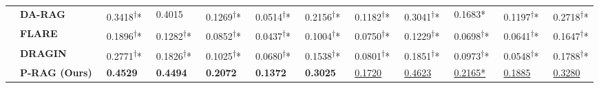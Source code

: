 \documentclass[sigconf,natbib=true,anonymous=false]{acmart}
\begin{document}
\begin{table}[t]
\begin{tabular}{|cl|c|c|c|c|c|c|c|c|c|c|}
& \textbf{DA-RAG} 
& \multicolumn{1}{l|}{~0.3418\textsuperscript{\tiny $\dagger$}*}& \multicolumn{1}{l|}{~0.4015}& \multicolumn{1}{l|}{~0.1269\textsuperscript{\tiny $\dagger$}*}& \multicolumn{1}{l|}{~0.0514\textsuperscript{\tiny $\dagger$}*}& \multicolumn{1}{l|}{~0.2156\textsuperscript{\tiny $\dagger$}*}& \multicolumn{1}{l|}{~0.1182\textsuperscript{\tiny $\dagger$}*}& \multicolumn{1}{l|}{~0.3041\textsuperscript{\tiny $\dagger$}*}& \multicolumn{1}{l|}{~0.1683*}& \multicolumn{1}{l|}{~0.1197\textsuperscript{\tiny $\dagger$}*}& \multicolumn{1}{l|}{~0.2718\textsuperscript{\tiny $\dagger$}*}\\


& \textbf{FLARE} 
& \multicolumn{1}{l|}{~0.1896\textsuperscript{\tiny $\dagger$}*}& \multicolumn{1}{l|}{~0.1282\textsuperscript{\tiny $\dagger$}*}& \multicolumn{1}{l|}{~0.0852\textsuperscript{\tiny $\dagger$}*}& \multicolumn{1}{l|}{~0.0437\textsuperscript{\tiny $\dagger$}*}& \multicolumn{1}{l|}{~0.1004\textsuperscript{\tiny $\dagger$}*}& \multicolumn{1}{l|}{~0.0750\textsuperscript{\tiny $\dagger$}*}& \multicolumn{1}{l|}{~0.1229\textsuperscript{\tiny $\dagger$}*}& \multicolumn{1}{l|}{~0.0698\textsuperscript{\tiny $\dagger$}*}& \multicolumn{1}{l|}{~0.0641\textsuperscript{\tiny $\dagger$}*}& \multicolumn{1}{l|}{~0.1647\textsuperscript{\tiny $\dagger$}*}\\

& \textbf{DRAGIN}
& \multicolumn{1}{l|}{~0.2771\textsuperscript{\tiny $\dagger$}*}& \multicolumn{1}{l|}{~0.1826\textsuperscript{\tiny $\dagger$}*}& \multicolumn{1}{l|}{~0.1025\textsuperscript{\tiny $\dagger$}*}& \multicolumn{1}{l|}{~0.0680\textsuperscript{\tiny $\dagger$}*}& \multicolumn{1}{l|}{~0.1538\textsuperscript{\tiny $\dagger$}*}& \multicolumn{1}{l|}{~0.0801\textsuperscript{\tiny $\dagger$}*}& \multicolumn{1}{l|}{~0.1851\textsuperscript{\tiny $\dagger$}*}& \multicolumn{1}{l|}{~0.0973\textsuperscript{\tiny $\dagger$}*}& \multicolumn{1}{l|}{~0.0548\textsuperscript{\tiny $\dagger$}*}& \multicolumn{1}{l|}{~0.1788\textsuperscript{\tiny $\dagger$}*}\\

& \textbf{P-RAG (Ours)}
& \multicolumn{1}{l|}{~\textbf{0.4529}}& \multicolumn{1}{l|}{~\textbf{0.4494}}& \multicolumn{1}{l|}{~\textbf{0.2072}}& \multicolumn{1}{l|}{~\textbf{0.1372}}& \multicolumn{1}{l|}{~\textbf{0.3025}}& \multicolumn{1}{l|}{~\underline{0.1720}}& \multicolumn{1}{l|}{~\underline{0.4623}}& \multicolumn{1}{l|}{~\underline{0.2165*}}& \multicolumn{1}{l|}{~\underline{0.1885}}& \multicolumn{1}{l|}{~\underline{0.3280}}\\


\end{tabular}
\end{table}
\end{document}
